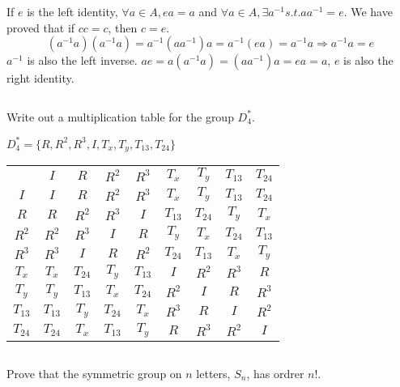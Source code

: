 \begin{answer}
    If $e$ is the left identity, $\forall a \in A, ea=a$ and $\forall a\in A ,\exists  a^{-1} s.t. aa^{-1}=e$. We have proved that if $cc=c$, then $c=e$. \[(a^{-1}a)(a^{-1}a)=a^{-1}(aa^{-1})a=a^{-1}(ea)=a^{-1}a\Rightarrow a^{-1}a=e\]
    $a^{-1}$ is also the left inverse. $ae=a(a^{-1}a)=(aa^{-1})a=ea=a$, $e$ is also the right identity.
\end{answer}

$$ $$

\begin{ex}
    Write out a multiplication table for the group $D_4^*$.
\end{ex}

\begin{answer}
    $D_4^*=\{R,R^{2}, R^{3},I,T_x,T_y,T_{13},T_{24}\}$
    \begin{table}[H]
        \centering
        \begin{tabular}{c|cccccccc}
        \multicolumn{1}{c}{} & $I$ & $R$ & $R^{2}$ & $R^{3}$ & $T_x$ & $T_y$ & $T_{13}$ & $T_{24}$  \\ 
        \cline{2-9}
        $I$ & $I$ & $R$ & $R^{2}$ & $R^{3}$ & $T_x$ & $T_y$ & $T_{13}$ &  $T_{24}$ \\
        $R$ & $R$ & $R^{2}$ & $R^{3}$ & $I$ & $T_{13}$ & $T_{24}$ & $T_y$ & $T_x$  \\
        $R^{2}$ & $R^{2}$ & $R^{3}$ & $I$ & $R$  & $T_y$ & $T_x$ & $T_{24}$ & $T_{13}$  \\
        $R^{3}$ & $R^{3}$ & $I$ & $R$  & $R^{2}$ & $T_{24}$ & $T_{13}$ & $T_x$ & $T_y$  \\
        $T_x$ & $T_x$ & $T_{24}$ & $T_y$ & $T_{13}$ & $I$ & $R^{2}$ & $R^{3}$ & $R$  \\
        $T_y$ & $T_y$ & $T_{13}$ & $T_x$ & $T_{24}$ & $R^{2}$ & $I$ & $R$ & $R^{3}$  \\
        $T_{13}$ & $T_{13}$ & $T_y$ & $T_{24}$ & $T_x$ & $R^{3}$ & $R$ & $I$ &  $R^{2}$ \\
        $T_{24}$ & $T_{24}$ & $T_x$ & $T_{13}$ & $T_y$ & $R$ & $R^{3}$ & $R^{2}$ &  $I$
        \end{tabular}
        \end{table}
\end{answer}

$$ $$

\begin{ex}
    Prove that the symmetric group on $n$ letters, $S_n$, has ordrer $n!$.
\end{ex}

